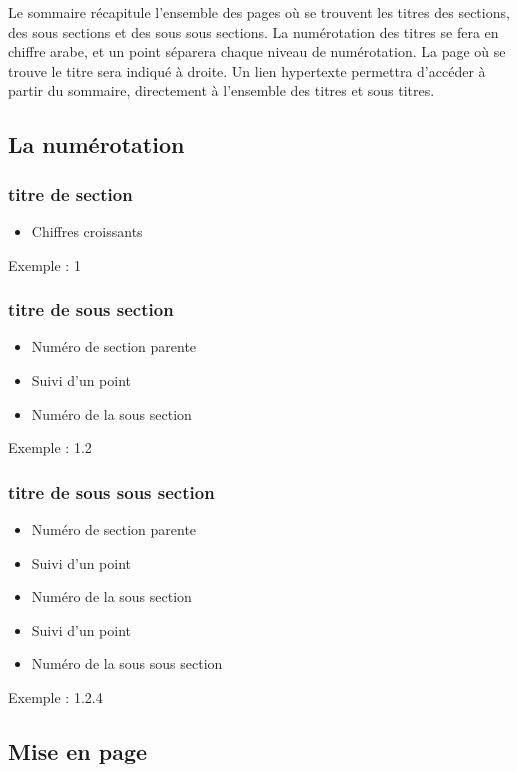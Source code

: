    Le sommaire récapitule l'ensemble des pages où se trouvent les titres des sections, des sous sections et des sous sous sections.
   La numérotation des titres se fera en chiffre arabe, et un point séparera chaque niveau de numérotation.
   La page où se trouve le titre sera indiqué à droite.
   Un lien hypertexte permettra d'accéder à partir du sommaire, directement à l'ensemble des titres et sous titres.

\subsection{La numérotation}
   
   \subsubsection{titre de section}
   \begin{itemize}
        \item Chiffres croissants
   \end{itemize}
        Exemple : 1

   \subsubsection{titre de sous section}
   \begin{itemize}
      \item Numéro de section parente
      \item Suivi d'un point
      \item Numéro de la sous section
   \end{itemize}
        Exemple : 1.2

   \subsubsection{titre de sous sous section}
   \begin{itemize}
      \item Numéro de section parente
      \item Suivi d'un point
      \item Numéro de la sous section
      \item Suivi d'un point
      \item Numéro de la sous sous section
   \end{itemize}
        Exemple : 1.2.4

    \subsection{Mise en page}

